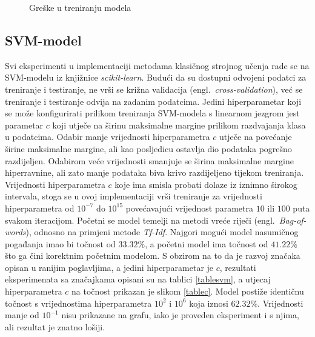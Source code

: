\documentclass[times, utf8, zavrsni]{fer}
\begin{document}
\begin{figure}
     \centering
     \caption{Greške u treniranju modela \citep{al-masri_2019}}
     \label{greskeutreningu}
\end{figure}


\subsection{\gls{SVM}-model}
Svi eksperimenti u implementaciji metodama klasičnog strojnog učenja rade se na \gls{SVM}-modelu iz knjižnice \emph{scikit-learn}. Budući da su dostupni odvojeni podatci za treniranje i testiranje, ne vrši se križna validacija (engl.~\emph{cross-validation}), već se treniranje i testiranje odvija na zadanim podatcima. Jedini hiperparametar koji se može konfigurirati prilikom treniranja \gls{SVM}-modela s linearnom jezgrom jest parametar $c$ koji utječe na širinu maksimalne margine prilikom razdvajanja klasa u podatcima. Odabir manje vrijednosti hiperparametra $c$ utječe na povećanje širine maksimalne margine, ali kao posljedicu ostavlja dio podataka pogrešno razdijeljen. Odabirom veće vrijednosti smanjuje se širina maksimalne margine hiperravnine, ali zato manje podataka biva krivo razdijeljeno tijekom treniranja. Vrijednosti hiperparametra $c$ koje ima smisla probati dolaze iz iznimno širokog intervala, stoga se u ovoj implementaciji vrši treniranje za vrijednosti hiperparametra od $10^{-7}$ do $10^{15}$ povećavajući vrijednost parametra $10$ ili $100$ puta svakom iteracijom. Početni se model temelji na metodi vreće riječi (engl.~\emph{Bag-of-words}), odnosno na primjeni metode \emph{Tf-Idf}. Najgori mogući model nasumičnog pogađanja imao bi točnost od $33.32\%$, a početni model ima točnost od $41.22\%$ što ga čini korektnim početnim modelom. S obzirom na to da je razvoj značaka opisan u ranijim poglavljima, a jedini hiperparametar je $c$, rezultati eksperimenata sa značajkama opisani su na tablici \ref{tablesvm}, a utjecaj hiperparametra $c$ na točnost prikazan je slikom \ref{tablec}. Model postiže identičnu točnost s vrijednostima hiperparametra $10^2$ i $10^6$ koja iznosi $62.32\%$. Vrijednosti manje od $10^{-1}$ nisu prikazane na grafu, iako je proveden eksperiment i s njima, ali rezultat je znatno lošiji.
\end{document}
